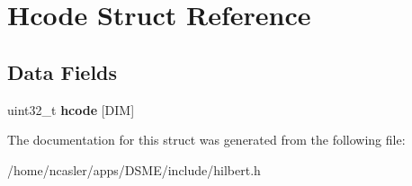 \hypertarget{structHcode}{}\section{Hcode Struct Reference}
\label{structHcode}
\subsection*{Data Fields}
\begin{DoxyCompactItemize}
\item 
\hypertarget{structHcode_a9a4152613f4a4ffc9cee382656c95b21}{}uint32\+\_\+t {\bfseries hcode} \mbox{[}D\+I\+M\mbox{]}\label{structHcode_a9a4152613f4a4ffc9cee382656c95b21}

\end{DoxyCompactItemize}


The documentation for this struct was generated from the following file\+:\begin{DoxyCompactItemize}
\item 
/home/ncasler/apps/\+D\+S\+M\+E/include/hilbert.\+h\end{DoxyCompactItemize}
